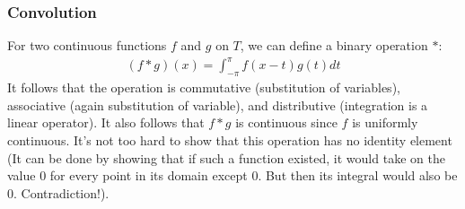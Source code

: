 \documentclass[12pt, titlepage]{article}
\newtheorem{prop}[thm]{Proposition}
\theoremstyle{definition}
\newcommand{\vep}{\varepsilon}
\begin{document}
\subsubsection{Convolution}
For two continuous functions $f$ and $g$ on $T$, we can define a binary operation $\ast$:
\begin{align*}
    (f \ast g)(x) = \int_{-\pi}^{\pi} f(x-t) g(t) dt
\end{align*}
It follows that the operation is commutative (substitution of variables), associative (again substitution of variable), and distributive (integration is a linear operator). It also follows that $f \ast g$ is continuous since $f$ is uniformly continuous. It's not too hard to show that this operation has no identity element (It can be done by showing that if such a function existed, it would take on the value $0$ for every point in its domain except $0$. But then its integral would also be $0$. Contradiction!).
%
%    
%    
\end{document}
